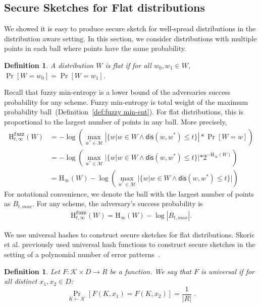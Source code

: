 \documentclass[11pt]{article}
\newcommand{\defref}[1]{\mbox{Definition~\ref{#1}}}
\newcommand{\lemref}[1]{\mbox{Lemma~\ref{#1}}}
\newcommand{\dis}{\ensuremath{\mathsf{dis}}}
\newcommand{\Hoo}{\mathrm{H}_\infty}
\newcommand{\Hfuzz}{\mathrm{H}^{\mathtt{fuzz}}_{t,\infty}}
\newtheorem{definition}[theorem]{Definition}
\begin{document}
\subsection{Secure Sketches for Flat distributions}
We showed it is easy to produce secure sketch for well-spread distributions in the distribution aware setting.
In this section, we consider distributions with multiple points in each ball where points have the same probability.

\begin{definition}
A distribution $W$ is \emph{flat} if for all $w_0, w_1 \in W$, $\Pr[W=w_0] = \Pr[W=w_1]$.  
\end{definition}

Recall that fuzzy min-entropy is a lower bound of the adversaries success probability for any scheme.  Fuzzy min-entropy is total weight of the maximum probability ball~(\defref{def:fuzzy min-ent}).  For flat distributions, this is proportional to the largest number of points in any ball.  More precisely, 
\begin{align*}
\Hfuzz(W) &= -\log \left(\max_{w^* \in \mathcal{M}} \left| \{w | w\in W \wedge \dis(w, w^*)\le t\} \right|* \Pr[W=w]\right) \\
&= -\log\left( \max_{w^* \in \mathcal{M}} |\{w | w\in W \wedge \dis(w, w^*)\le t\}| *2^{-\Hoo(W)}\right) \\
&=\Hoo(W) -\log\left( \max_{w^* \in \mathcal{M}}| \{w | w\in W \wedge \dis(w, w^*)\le t\} |\right)
\end{align*}
For notational convenience, we denote the ball with the largest number of points as $B_{t, max}$.  For any scheme, the adversary's success probability is 
\begin{align}
\Hfuzz(W) = \Hoo(W) -\log |B_{t, max}|.\label{eq:fuzz for flat}
\end{align}

\noindent We use universal hashes to construct secure sketches for flat distributions.  Skoric et al. previously used universal hash functions to construct secure sketches in the setting of a polynomial number of error patterns~\cite{skoric2009efficient}.


\begin{definition}
Let $F : \mathcal{K} \times D \to R$ be a function.  We say that $F$ is \emph{universal} if for all distinct $x_1, x_2 \in D$:
\[
 \Pr_{K \leftarrow \mathcal{K}}[F(K, x_1) = F(K, x_2)] = \frac{1}{|R|} \;.
\]
\end{definition}
\end{document}

